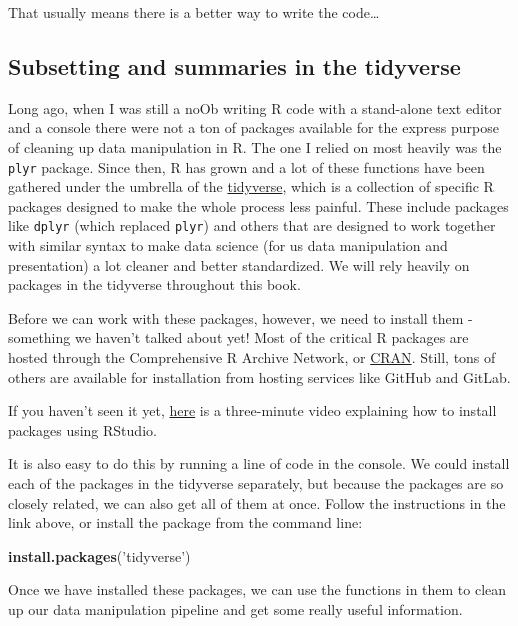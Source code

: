 \documentclass[
]{book}
\newenvironment{Shaded}{\begin{snugshade}}{\end{snugshade}}
\newcommand{\KeywordTok}[1]{\textcolor[rgb]{0.13,0.29,0.53}{\textbf{#1}}}
\newcommand{\NormalTok}[1]{#1}
\newcommand{\StringTok}[1]{\textcolor[rgb]{0.31,0.60,0.02}{#1}}
\begin{document}
That usually means there is a better way to write the code\ldots{}

\hypertarget{tidyverse}{%
\subsection{Subsetting and summaries in the tidyverse}\label{tidyverse}}

Long ago, when I was still a noOb writing R code with a stand-alone text editor and a console there were not a ton of packages available for the express purpose of cleaning up data manipulation in R. The one I relied on most heavily was the \texttt{plyr} package. Since then, R has grown and a lot of these functions have been gathered under the umbrella of the \href{https://www.tidyverse.org/packages/}{tidyverse}, which is a collection of specific R packages designed to make the whole process less painful. These include packages like \texttt{dplyr} (which replaced \texttt{plyr}) and others that are designed to work together with similar syntax to make data science (for us data manipulation and presentation) a lot cleaner and better standardized. We will rely heavily on packages in the tidyverse throughout this book.

Before we can work with these packages, however, we need to install them - something we haven't talked about yet! Most of the critical R packages are hosted through the Comprehensive R Archive Network, or \href{https://cran.r-project.org/}{CRAN}. Still, tons of others are available for installation from hosting services like GitHub and GitLab.

If you haven't seen it yet, \href{https://www.youtube.com/watch?v=u1r5XTqrCTQ}{here} is a three-minute video explaining how to install packages using RStudio.

It is also easy to do this by running a line of code in the console. We could install each of the packages in the tidyverse separately, but because the packages are so closely related, we can also get all of them at once. Follow the instructions in the link above, or install the package from the command line:

\begin{Shaded}
\begin{Highlighting}[]
\KeywordTok{install.packages}\NormalTok{(}\StringTok{'tidyverse'}\NormalTok{)}
\end{Highlighting}
\end{Shaded}

Once we have installed these packages, we can use the functions in them to clean up our data manipulation pipeline and get some really useful information.
\end{document}

